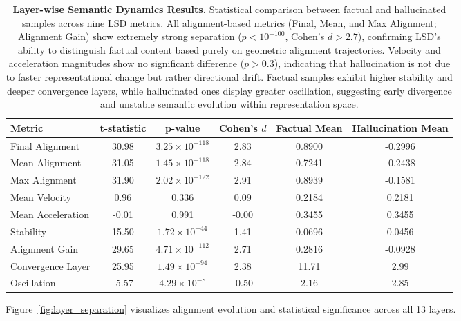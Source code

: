 \documentclass[11pt]{article}
\begin{document}
\begin{table*}[t]
\centering
\small
\begin{tabular}{lccccc}
\toprule
\textbf{Metric} & \textbf{t-statistic} & \textbf{p-value} & \textbf{Cohen's $d$} & \textbf{Factual Mean} & \textbf{Hallucination Mean} \\
\midrule
Final Alignment       & 30.98  & $3.25 \times 10^{-118}$ & 2.83  & 0.8900 & -0.2996 \\
Mean Alignment        & 31.05  & $1.45 \times 10^{-118}$ & 2.84  & 0.7241 & -0.2438 \\
Max Alignment         & 31.90  & $2.02 \times 10^{-122}$ & 2.91  & 0.8939 & -0.1581 \\
Mean Velocity         & 0.96   & 0.336                   & 0.09  & 0.2184 & 0.2181 \\
Mean Acceleration     & -0.01  & 0.991                   & -0.00 & 0.3455 & 0.3455 \\
Stability             & 15.50  & $1.72 \times 10^{-44}$  & 1.41  & 0.0696 & 0.0456 \\
Alignment Gain        & 29.65  & $4.71 \times 10^{-112}$ & 2.71  & 0.2816 & -0.0928 \\
Convergence Layer     & 25.95  & $1.49 \times 10^{-94}$  & 2.38  & 11.71  & 2.99 \\
Oscillation           & -5.57  & $4.29 \times 10^{-8}$   & -0.50 & 2.16   & 2.85 \\
\bottomrule
\end{tabular}
\caption{
\textbf{Layer-wise Semantic Dynamics Results.}
Statistical comparison between factual and hallucinated samples across nine LSD metrics. 
All alignment-based metrics (Final, Mean, and Max Alignment; Alignment Gain) show extremely strong separation ($p < 10^{-100}$, Cohen’s $d > 2.7$), confirming LSD’s ability to distinguish factual content based purely on geometric alignment trajectories. 
Velocity and acceleration magnitudes show no significant difference ($p > 0.3$), indicating that hallucination is not due to faster representational change but rather directional drift. 
Factual samples exhibit higher stability and deeper convergence layers, while hallucinated ones display greater oscillation, suggesting early divergence and unstable semantic evolution within representation space.
}
\label{tab:lsd_metrics}
\end{table*}




Figure~\ref{fig:layer_separation} visualizes alignment evolution and statistical significance across all 13 layers.
\end{document}
